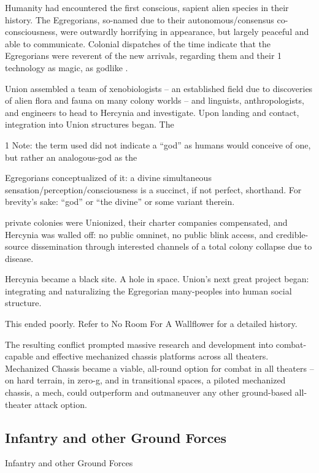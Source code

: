 Humanity had encountered the first conscious, sapient alien species in their history. The  
Egregorians, so-named due to their autonomous/consensus co-consciousness, were outwardly  
horrifying in appearance, but largely peaceful and able to communicate. Colonial dispatches of  
the time indicate that the Egregorians were reverent of the new arrivals, regarding them and their  
                                        1 
technology as magic, as godlike  .   

Union assembled a team of xenobiologists -- an established field due to discoveries of alien flora  
and fauna on many colony worlds -- and linguists, anthropologists, and engineers to head to  
Hercynia and investigate. Upon landing and contact, integration into Union structures began. The  

1 Note: the term used did not indicate a “god” as humans would conceive of one, but rather an analogous-god as the  

Egregorians conceptualized of it: a divine simultaneous sensation/perception/consciousness is a succinct, if not  
perfect, shorthand. For brevity’s sake: “god” or “the divine” or some variant therein. 

                                                                                                                     


private colonies were Unionized, their charter companies compensated, and Hercynia was  
walled off: no public omninet, no public blink access, and credible-source dissemination through  
interested channels of a total colony collapse due to disease. 
 

Hercynia became a black site. A hole in space. Union’s next great project began: integrating and  
naturalizing the Egregorian many-peoples into human social structure. 
 

This ended poorly. Refer to No Room For A Wallflower for a detailed history.
 

The resulting conflict prompted massive research and development into combat-capable and  
effective mechanized chassis platforms across all theaters. Mechanized Chassis became a  
viable, all-round option for combat in all theaters -- on hard terrain, in zero-g, and in transitional  
spaces, a piloted mechanized chassis, a mech, could outperform and outmaneuver any other  
ground-based all-theater attack option.   
\subsection{Infantry and other Ground Forces}
Infantry and other Ground Forces  

